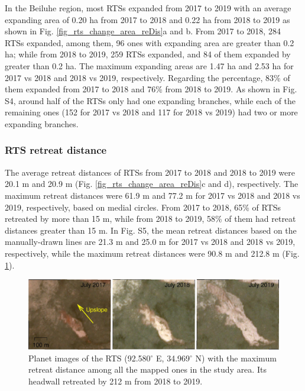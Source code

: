 \documentclass[authoryear,preprint,review,12pt]{elsarticle}
\begin{document}

In the Beiluhe region, most RTSs expanded from 2017 to 2019 with an average expanding area of 0.20 ha from 2017 to 2018 and 0.22 ha from 2018 to 2019 as shown in Fig. \ref{fig_rts_change_area_reDis}a and b.
From 2017 to 2018, 284 RTSs expanded, among them, 96 ones with expanding area are greater than 0.2 ha; while from 2018 to 2019, 259 RTSs expanded, and 84 of them expanded by greater than 0.2 ha.
The maximum expanding areas are 1.47 ha and 2.53 ha for 2017 vs 2018 and 2018 vs 2019, respectively. 
Regarding the percentage, 83\% of them expanded from 2017 to 2018 and 76\% from 2018 to 2019. 
As shown in Fig. S4, around half of the RTSs only had one expanding branches, while each of the remaining ones (152 for 2017 vs 2018 and 117 for 2018 vs 2019)  had two or more expanding branches. 




\subsubsection{RTS retreat distance}
\label{sec_rts_retreat_distance}

The average retreat distances of RTSs from 2017 to 2018 and 2018 to 2019 were 20.1 m and 20.9 m (Fig. \ref{fig_rts_change_area_reDis}c and d), respectively. 
The maximum retreat distances were 61.9 m and 77.2 m for 2017 vs 2018 and 2018 vs 2019, respectively, based on medial circles. 
From 2017 to 2018, 65\% of RTSs retreated by more than 15 m, while from 2018 to 2019, 58\% of them had retreat distances greater than 15 m. 
In Fig. S5, the mean retreat distances based on the manually-drawn lines are 21.3 m and 25.0 m for 2017 vs 2018 and 2018 vs 2019, respectively, while the maximum retreat distances were 90.8 m and 212.8 m (Fig. \ref{fig_rts_example1}).


\begin{figure} 
	\centering
	\includegraphics[width=14cm]{figs/img_2017_to_2019_ex1.jpg}
	\caption{Planet images of the RTS (92.580$^\circ$ E, 34.969$^\circ$ N) with the maximum retreat distance among all the mapped ones in the study area. Its headwall retreated by 212 m from 2018 to 2019.}
	\label{fig_rts_example1}
\end{figure}
\end{document}
